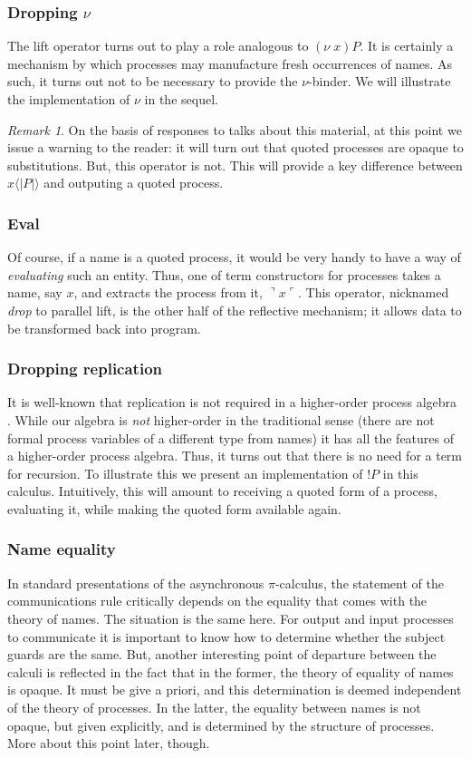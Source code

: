 \documentclass[]{amsart}
\newcommand{\lliftb}{\langle\!|}
\newcommand{\rliftb}{|\!\rangle}
\newcommand{\lpquote}{\ulcorner}
\newcommand{\rpquote}{\urcorner}
\newcommand{\lift}[2]{#1 \lliftb #2 \rliftb}
\newcommand{\dropn}[1]{\rpquote #1 \lpquote}
\theoremstyle{definition}
\theoremstyle{remark}
\newtheorem{rem}[thm]{Remark}
\numberwithin{equation}{subsection}
\newcommand{\pic}{$\pi$-calculus}
\begin{document}
\subsubsection{Dropping $\nu$}
The lift operator turns out to play a role analogous to $(\nu \;
x)P$. It is certainly a mechanism by which processes may manufacture
fresh occurrences of names. As such, it turns out not to be necessary
to provide the $\nu$-binder. We will illustrate the implementation of
$\nu$ in the sequel.

\begin{rem}
On the basis of responses to talks about this material, at this point
we issue a warning to the reader: it will turn out that quoted
processes are opaque to substitutions. But, this operator is not. This
will provide a key difference between $\lift{x}{P}$ and outputing a
quoted process.
\end{rem}

\subsubsection{Eval}
Of course, if a name is a quoted process, it would be very handy to
have a way of \textit{evaluating} such an entity. Thus, one of term
constructors for processes takes a name, say $x$, and extracts the
process from it, $\dropn{x}$. This operator, nicknamed \emph{drop} to
parallel lift, is the other half of the reflective mechanism; it
allows data to be transformed back into program.

\subsubsection{Dropping replication}
It is well-known that replication is not required in a higher-order
process algebra \cite{SangiorgiWalker}. While our algebra is
\textit{not} higher-order in the traditional sense (there are not
formal process variables of a different type from names) it has all
the features of a higher-order process algebra. Thus, it turns out
that there is no need for a term for recursion. To illustrate this we
present an implementation of $!P$ in this calculus. Intuitively, this
will amount to receiving a quoted form of a process, evaluating it,
while making the quoted form available again.

\subsubsection{Name equality}
In standard presentations of the asynchronous {\pic}, the
statement of the communications rule critically depends on the
equality that comes with the theory of names. The situation is the
same here. For output and input processes to communicate it is
important to know how to determine whether the subject guards are the
same. But, another interesting point of departure between the calculi
is reflected in the fact that in the former, the theory of equality of
names is opaque. It must be give a priori, and this determination is
deemed independent of the theory of processes. In the latter, the
equality between names is not opaque, but given explicitly, and is
determined by the structure of processes. More about this point later,
though.
\end{document}
